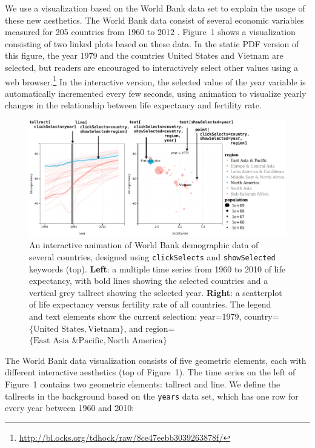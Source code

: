 \documentclass[12pt]{article}\usepackage[]{graphicx}\usepackage[]{color}
\begin{document}
We use a visualization based on the World Bank data set to explain
the usage of these new aesthetics. The World Bank data consist of
several economic variables measured for 205 countries from 1960 to
2012 \citep{WorldBank}. Figure~1 shows a visualization consisting of
two linked plots based on these data. In the static PDF version of
this figure, the year 1979 and the countries United States and Vietnam
are selected, but readers are encouraged to interactively select other
values using a web
browser.\footnote{\url{http://bl.ocks.org/tdhock/raw/8ce47eebb3039263878f/}}
In the interactive version, the selected value of the year variable is
automatically incremented every few seconds, using animation to
visualize yearly changes in the relationship between life expectancy
and fertility rate.

\begin{figure}[b!]
  \centering
  \includegraphics[width=\textwidth]{figure-1}
  \caption{An interactive animation of World Bank demographic data of
    several countries, designed using \texttt{clickSelects} and
    \texttt{showSelected} keywords (top).  \textbf{Left}: a multiple
    time series from 1960 to 2010 of life expectancy, with bold lines
    showing the selected countries and a vertical grey tallrect
    showing the selected year. \textbf{Right}: a scatterplot of life
    expectancy versus fertility rate of all countries. The legend and
    text elements show the current selection: year=1979,
    country=$\{\textrm{United States}, \textrm{Vietnam}\}$, and
    region=$\{\textrm{East Asia \& Pacific}, \textrm{North
      America}\}$}
  \label{fig:1}
\end{figure}

The World Bank data visualization consists of five geometric elements,
each with different interactive aesthetics (top of Figure~1). The time
series on the left of Figure~1 contains two geometric elements:
tallrect and line. We define the tallrects in the background based on
the \texttt{years} data set, which has one row for every year between
1960 and 2010:
\end{document}
